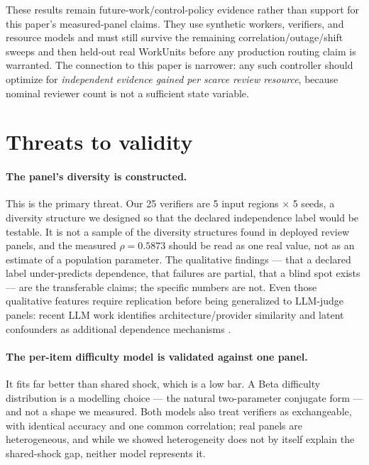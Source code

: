 \documentclass[11pt,a4paper]{article}
\begin{document}
These results remain future-work/control-policy evidence rather than support for
this paper's measured-panel claims. They use synthetic workers, verifiers, and
resource models and must still survive the remaining correlation/outage/shift
sweeps and then held-out real WorkUnits before any production routing claim is
warranted. The connection to this paper is narrower: any such controller should
optimize for \emph{independent evidence gained per scarce review resource},
because nominal reviewer count is not a sufficient state variable.

\section{Threats to validity}
\label{sec:threats}

\paragraph{The panel's diversity is constructed.} This is the primary threat. Our
25 verifiers are 5 input regions $\times$ 5 seeds, a diversity structure we
designed so that the declared independence label would be testable. It is not a
sample of the diversity structures found in deployed review panels, and the
measured $\rho = 0.5873$ should be read as one real value, not as an estimate of
a population parameter. The qualitative findings --- that a declared label
under-predicts dependence, that failures are partial, that a blind spot exists ---
are the transferable claims; the specific numbers are not. Even those qualitative
features require replication before being generalized to LLM-judge panels:
recent LLM work identifies architecture/provider similarity and latent
confounders as additional dependence mechanisms \citep{kim2025correlated,
zhao2026care}.

\paragraph{The per-item difficulty model is validated against one panel.} It fits
far better than shared shock, which is a low bar. A Beta difficulty distribution
is a modelling choice --- the natural two-parameter conjugate form --- and not a
shape we measured. Both models also treat verifiers as exchangeable, with
identical accuracy and one common correlation; real panels are heterogeneous, and
while we showed heterogeneity does not by itself explain the shared-shock gap,
neither model represents it.
\end{document}
